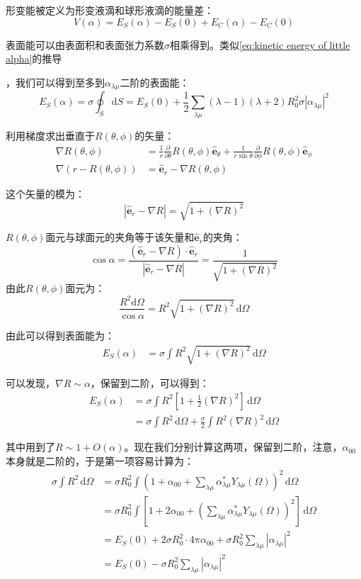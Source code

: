 形变能被定义为形变液滴和球形液滴的能量差：
\[
V(\alpha)=E_{S}(\alpha)-E_{S}(0)+E_{C}(\alpha)-E_{C}(0)
\]

表面能可以由表面积和表面张力系数$\sigma$相乘得到。类似\ref{eq:kinetic energy of little alpha}的推导

，我们可以得到至多到$\alpha_{\lambda\mu}$二阶的表面能：
\[
E_{S}(\alpha)=\sigma\oint_{S}\mathrm{d}S=E_{S}(0)+\frac{1}{2}\sum_{\lambda\mu}(\lambda-1)(\lambda+2)R^{2}_{0}\sigma\left|\alpha_{\lambda\mu}\right|^{2}
\]

\begin{booknote*}
利用梯度求出垂直于$R(\theta,\phi)$的矢量：
\begin{align*}
\nabla R(\theta,\phi) & =\frac{1}{r}\frac{\partial}{\partial\theta}R(\theta,\phi)\hat{\boldsymbol{e}}_{\theta}+\frac{1}{r\sin\theta}\frac{\partial}{\partial\phi}R(\theta,\phi)\hat{\boldsymbol{e}}_{\phi}\\
\nabla(r-R(\theta,\phi)) & =\hat{\boldsymbol{e}}_{r}-\nabla R(\theta,\phi)
\end{align*}

这个矢量的模为：
\[
\left|\hat{\boldsymbol{e}}_{r}-\nabla R\right|=\sqrt{1+(\nabla R)^{2}}
\]

$R(\theta,\phi)$面元与球面元的夹角等于该矢量和$\hat{\boldsymbol{e}}_{r}$的夹角：
\[
\cos\alpha=\frac{(\hat{\boldsymbol{e}}_{r}-\nabla R)\cdot\hat{\boldsymbol{e}}_{r}}{\left|\hat{\boldsymbol{e}}_{r}-\nabla R\right|}=\frac{1}{\sqrt{1+(\nabla R)^{2}}}
\]
由此$R(\theta,\phi)$面元为：
\[
\frac{R^{2}\mathrm{d}\Omega}{\cos\alpha}=R^{2}\sqrt{1+(\nabla R)^{2}}\,\mathrm{d}\Omega
\]

由此可以得到表面能为：
\begin{align*}
E_{S}(\alpha) & =\sigma\int R^{2}\sqrt{1+(\nabla R)^{2}}\,\mathrm{d}\Omega
\end{align*}

可以发现，$\nabla R\sim\alpha$，保留到二阶，可以得到：
\begin{align*}
E_{S}(\alpha) & =\sigma\int R^{2}[1+\frac{1}{2}(\nabla R)^{2}]\,\mathrm{d}\Omega\\
 & =\sigma\int R^{2}\,\mathrm{d}\Omega+\frac{\sigma}{2}\int R^{2}(\nabla R)^{2}\,\mathrm{d}\Omega
\end{align*}

其中用到了$R\sim1+O(\alpha)$。现在我们分别计算这两项，保留到二阶，注意，$\alpha_{00}$本身就是二阶的，于是第一项容易计算为：
\begin{align*}
\sigma\int R^{2}\,\mathrm{d}\Omega & =\sigma R^{2}_{0}\int\left(1+\alpha_{00}+\sum_{\lambda\mu}\alpha^{*}_{\lambda\mu}Y_{\lambda\mu}(\Omega)\right)^{2}\,\mathrm{d}\Omega\\
 & =\sigma R^{2}_{0}\int\left[1+2\alpha_{00}+\left(\sum_{\lambda\mu}\alpha^{*}_{\lambda\mu}Y_{\lambda\mu}(\Omega)\right)^{2}\right]\,\mathrm{d}\Omega\\
 & =E_{S}(0)+2\sigma R^{2}_{0}\cdot4\mathrm{\pi}\alpha_{00}+\sigma R^{2}_{0}\sum_{\lambda\mu}\left|\alpha_{\lambda\mu}\right|^{2}\\
 & =E_{S}(0)-\sigma R^{2}_{0}\sum_{\lambda\mu}\left|\alpha_{\lambda\mu}\right|^{2}
\end{align*}


\end{booknote*}
